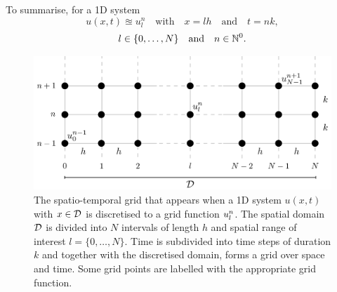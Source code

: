 To summarise, for a 1D system
\begin{equation*}
    u(x,t) \approxeq u_l^n \quad \text{with} \quad x=lh \quad \text{and} \quad t = nk,
\end{equation*}
\begin{equation*}
    l\in\{0, \hdots, N\}\quad \text{and} \quad n \in \mathbb{N}^0.
\end{equation*}

\begin{figure}[h]
    \centering
    \includegraphics[width=\textwidth]{figures/fdtd/gridFigure3.pdf}
    \caption{The spatio-temporal grid that appears when a 1D system $u(x,t)$ with $x\in \mathcal{D}$ is discretised to a grid function $u_l^n$. The spatial domain $\mathcal{D}$ is divided into $N$ intervals of length $h$ and spatial range of interest $l=\{0, \hdots, N\}$. Time is subdivided into time steps of duration $k$ and together with the discretised domain, forms a grid over space and time. Some grid points are labelled with the appropriate grid function. \label{fig:gridExp}}
\end{figure}


